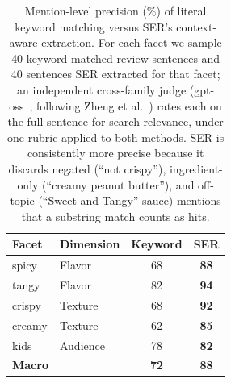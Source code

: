 \begin{table}[t]
\centering
\small
\setlength{\tabcolsep}{7pt}
\begin{tabular}{@{}llcc@{}}
\toprule
\textbf{Facet} & \textbf{Dimension} & \textbf{Keyword} & \textbf{SER} \\
\midrule
spicy  & Flavor   & 68 & \textbf{88} \\
tangy  & Flavor   & 82 & \textbf{94} \\
crispy & Texture  & 68 & \textbf{92} \\
creamy & Texture  & 62 & \textbf{85} \\
kids   & Audience & 78 & \textbf{82} \\
\midrule
\textbf{Macro} & & \textbf{72} & \textbf{88} \\
\bottomrule
\end{tabular}
\caption{Mention-level precision (\%) of literal keyword matching versus SER's context-aware extraction. For each facet we sample 40 keyword-matched review sentences and 40 sentences SER extracted for that facet; an independent cross-family judge (gpt-oss~\cite{openai2025gptoss}, following Zheng et al.~\cite{zheng2024judging}) rates each on the full sentence for search relevance, under one rubric applied to both methods. SER is consistently more precise because it discards negated (``not crispy''), ingredient-only (``creamy peanut butter''), and off-topic (``Sweet and Tangy'' sauce) mentions that a substring match counts as hits.}
\label{tab:mention-precision}
\end{table}

